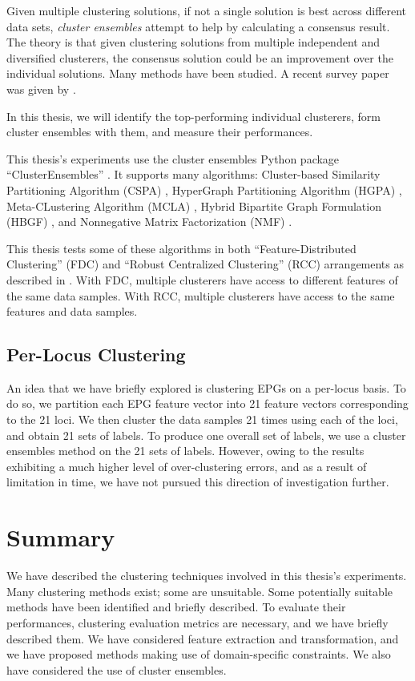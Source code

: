 Given multiple clustering solutions, if not a single solution is best across different data sets, \emph{cluster ensembles} \cite{aggarwal_cluster_2018} attempt to help by calculating a consensus result. The theory is that given clustering solutions from multiple independent and diversified clusterers, the consensus solution could be an improvement over the individual solutions.  Many methods have been studied. A recent survey paper was given by \cite{boongoen_cluster_2018}.

In this thesis, we will identify the top-performing individual clusterers, form cluster ensembles with them, and measure their performances.

This thesis's experiments use the cluster ensembles Python package ``ClusterEnsembles'' \cite{sano_clusterensembles_nodate}. It supports many algorithms: Cluster-based Similarity Partitioning Algorithm (CSPA) \cite{strehl_cluster_2002},  HyperGraph Partitioning Algorithm (HGPA) \cite{strehl_cluster_2002}, Meta-CLustering Algorithm (MCLA) \cite{strehl_cluster_2002}, Hybrid Bipartite Graph Formulation (HBGF) \cite{fern_solving_2004}, and Nonnegative Matrix Factorization (NMF) \cite{li_solving_2007}.

This thesis tests some of these algorithms in both ``Feature-Distributed Clustering'' (FDC) and ``Robust Centralized Clustering'' (RCC) arrangements as described in \cite{strehl_cluster_2002}. With FDC, multiple clusterers have access to different features of the same data samples. With RCC, multiple clusterers have access to the same features and data samples.

\subsection{Per-Locus Clustering}

An idea that we have briefly explored is clustering EPGs on a per-locus basis. To do so, we partition each EPG feature vector into 21 feature vectors corresponding to the 21 loci. We then cluster the data samples 21 times using each of the loci, and obtain 21 sets of labels. To produce one overall set of labels, we use a cluster ensembles method on the 21 sets of labels. However, owing to the results exhibiting a much higher level of over-clustering errors, and as a result of limitation in time, we have not pursued this direction of investigation further.

\section{Summary}

We have described the clustering techniques involved in this thesis's experiments. Many clustering methods exist; some are unsuitable. Some potentially suitable methods have been identified and briefly described. To evaluate their performances, clustering evaluation metrics are necessary, and we have briefly described them. We have considered feature extraction and transformation, and we have proposed methods making use of domain-specific constraints. We also have considered the use of cluster ensembles.
